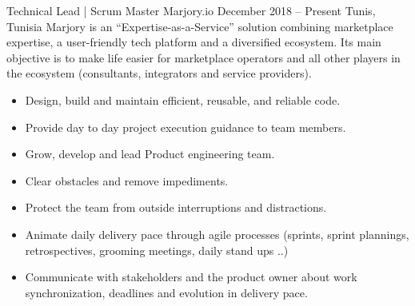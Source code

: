 \documentclass[10pt,a4paper]{resume-settings}
\begin{document}

\begin{fullwidth}
\makecvheader
\end{fullwidth}



\cvevent
    {Technical Lead | Scrum Master}
    {Marjory.io}
    {December 2018 -- Present}
    {Tunis, Tunisia}
    {Marjory is an “Expertise-as-a-Service” solution combining marketplace expertise, a user-friendly tech platform and a diversified ecosystem. Its main objective is to make life easier for marketplace operators and all other players in the ecosystem (consultants, integrators and service providers).}
    \begin{itemize}
        \item Design, build and maintain efficient, reusable, and reliable code.
        \item Provide day to day project execution guidance to team members.
        \item Grow, develop and lead Product engineering team.
        \item Clear obstacles and remove impediments.
        \item Protect the team from outside interruptions and distractions.
        \item Animate daily delivery pace through agile processes (sprints, sprint plannings, retrospectives, grooming meetings, daily stand ups ..)
        \item Communicate with stakeholders and the product owner about work synchronization, deadlines and evolution in delivery pace.
    \end{itemize}
\divider
\end{document}
